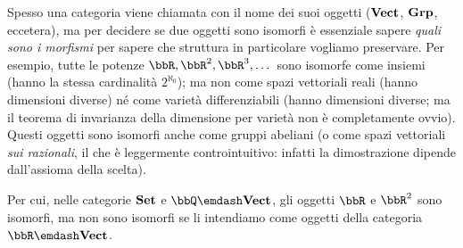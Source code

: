 \begin{warning}
	Spesso una categoria viene chiamata con il nome dei suoi oggetti (\(\mathbf{Vect}\), \(\mathbf{Grp}\), eccetera), ma per decidere se due oggetti sono isomorfi è essenziale sapere \emph{quali sono i morfismi} per sapere che struttura in particolare vogliamo preservare. Per esempio, tutte le potenze \(\bbR,\bbR^2,\bbR^3,\dots\) sono isomorfe come insiemi (hanno la stessa cardinalità \(2^{\aleph_0}\)); ma non come spazi vettoriali reali (hanno dimensioni diverse) né come varietà differenziabili (hanno dimensioni diverse; ma il teorema di invarianza della dimensione per varietà non è completamente ovvio). Questi oggetti sono isomorfi anche come gruppi abeliani (o come spazi vettoriali \emph{sui razionali}, il che è leggermente controintuitivo: infatti la dimostrazione dipende dall'assioma della scelta).

	Per cui, nelle categorie \(\mathbf{Set}\) e \(\bbQ\emdash\ctVect\), gli oggetti \(\bbR\) e \(\bbR^2\) sono isomorfi, ma non sono isomorfi se li intendiamo come oggetti della categoria \(\bbR\emdash\ctVect\).
\end{warning}

